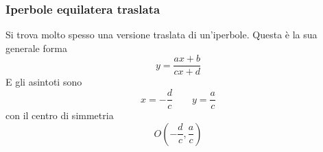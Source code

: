 \subsubsection{Iperbole equilatera traslata}
Si trova molto spesso una versione traslata di un'iperbole. Questa è la sua generale forma
\begin{equation*}
y=\frac{ax+b}{cx+d}
\end{equation*}
E gli asintoti sono
\begin{equation*}
x=-\frac{d}{c}\qquad y=\frac{a}{c}
\end{equation*}
con il centro di simmetria
\begin{equation*}
O\left(-\frac{d}{c},\frac{a}{c}\right)
\end{equation*}
